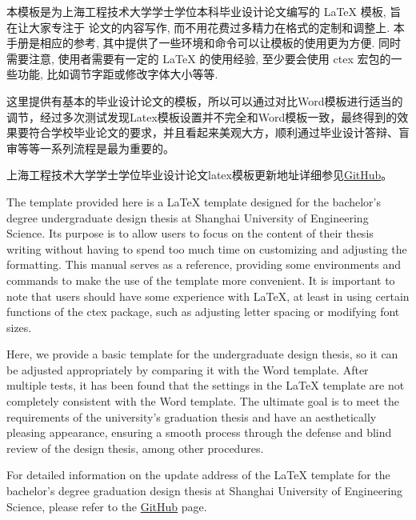 \begin{ChineseAbstract}
    本模板是为上海工程技术大学学士学位本科毕业设计论文编写的 \LaTeX{} 模板, 旨在让大家专注于    论文的内容写作, 而不用花费过多精力在格式的定制和调整上. 本手册是相应的参考, 其中提供了一些环境和命令可以让模板的使用更为方便. 同时需要注意, 使用者需要有一定的 \LaTeX{} 的使用经验, 至少要会使用 ctex 宏包的一些功能, 比如调节字距或修改字体大小等等.

    这里提供有基本的毕业设计论文的模板，所以可以通过对比Word模板进行适当的调节，经过多次测试发现Latex模板设置并不完全和Word模板一致，最终得到的效果要符合学校毕业论文的要求，并且看起来美观大方，顺利通过毕业设计答辩、盲审等等一系列流程是最为重要的。
    
    上海工程技术大学学士学位毕业设计论文latex模板更新地址详细参见\href{https://github.com/MobtgZhang/sues-thesis-bachelor}{GitHub}。
    \vspace{0.1\textheight}

\end{ChineseAbstract}

\newpage
\begin{EnglishAbstract}
    The template provided here is a \LaTeX{} template designed for the bachelor's degree undergraduate design thesis at Shanghai University of Engineering Science.
    Its purpose is to allow users to focus on the content of their thesis writing without having to spend too much time on customizing and adjusting the formatting.
    This manual serves as a reference, providing some environments and commands to make the use of the template more convenient.
    It is important to note that users should have some experience with \LaTeX{}, at least in using certain functions of the ctex package, such as adjusting letter spacing or modifying font sizes.

    Here, we provide a basic template for the undergraduate design thesis, so it can be adjusted appropriately by comparing it with the Word template.
    After multiple tests, it has been found that the settings in the \LaTeX{} template are not completely consistent with the Word template.
    The ultimate goal is to meet the requirements of the university's graduation thesis and have an aesthetically pleasing appearance,
    ensuring a smooth process through the defense and blind review of the design thesis, among other procedures.

    For detailed information on the update address of the \LaTeX{} template for the bachelor's degree graduation design thesis at Shanghai University of Engineering Science, please refer to the \href{https://github.com/MobtgZhang/sues-thesis-bachelor}{GitHub} page.
    \vspace{0.1\textheight}
    
\end{EnglishAbstract}

\newpage
